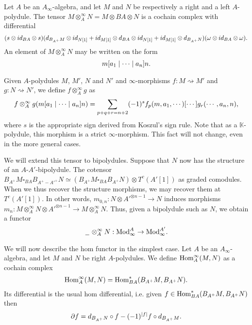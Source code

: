 \documentclass[../thesis.tex]{subfiles}
\begin{document}
            \begin{definition}
                Let $A$ be an $A_\infty$-algebra, and let $M$ and $N$ be respectively a right and a left $A$-polydule. The tensor $M \otimes^\infty_A N = M \otimes BA \otimes N$ is a cochain complex with differential
                \begin{align*}
                    (s\otimes id_{BA} \otimes s)(d_{B_{A^+}M} \otimes id_{N[1]} + id_{M[1]}\otimes d_{BA} \otimes id_{N[1]} + id_{M[1]}\otimes d_{B_{A^+}N})(\omega \otimes id_{BA} \otimes \omega)\tt{.}
                \end{align*}
                An element of $M \otimes^\infty_A N$ may be written on the form
                \begin{align*}
                    m[a_1 \mid \cdots \mid a_n]n\tt{.}
                \end{align*}
            \end{definition}

            Given $A$-polydules $M$, $M'$, $N$ and $N'$ and $\infty$-morphisms $f : M \rightsquigarrow M'$ and $g : N \rightsquigarrow N'$, we define $f \otimes^\infty_A g$ as
            \begin{align*}
                f\otimes^\infty_Ag(m[a_1 \mid \cdots \mid a_n]n) = \sum_{p+q+r = n+2} (-1)^s f_p(m, a_1, \cdots)[\cdots]g_r(\cdots, a_n, n)\tt{,}
            \end{align*}
            where $s$ is the appropriate sign derived from Koszul's sign rule. Note that as a $\mathbb{K}$-polydule, this morphism is a strict $\infty$-morphism. This fact will not change, even in the more general cases.

            We will extend this tensor to bipolydules. Suppose that $N$ now has the structure of an $A$-$A'$-bipolydule. The cotensor $B_{A^+}M \square_{BA} B_{A^+-A'^+}N \simeq (B_{A^+}M \square_{BA} B_{A^+}N) \otimes T^c(A'[1])$ as graded comodules. When we thus recover the structure morphisms, we may recover them at $T^c(A'[1])$. In other words, $m_{0,n} : N \otimes A'^{\otimes n-1} \rightarrow N$ induces morphisms $m_n : M \otimes^\infty_A N \otimes A'^{\otimes n-1} \rightarrow M \otimes^\infty_A N$. Thus, given a bipolydule such as $N$, we obtain a functor
            \begin{align*}
                \argument\otimes^\infty_AN : \tt{Mod}_\infty^A \rightarrow \tt{Mod}_\infty^{A'}\tt{.}
            \end{align*}

            We will now describe the hom functor in the simplest case. Let $A$ be an $A_\infty$-algebra, and let $M$ and $N$ be right $A$-polydules. We define $\tt{Hom}^\infty_A(M, N)$ as a cochain complex
            \begin{align*}
                \tt{Hom}^\infty_A(M,N) = \tt{Hom}_{BA}^*(B_{A^+}M, B_{A^+}N)\tt{.}
            \end{align*}
            Its differential is the usual hom differential, i.e. given $f \in \tt{Hom}_{BA}^*(B_{A^+}M,B_{A^+}N)$ then
            \begin{align*}
                \partial f = d_{B_{A^+}N}\circ f - (-1)^{|f|}f\circ d_{B_{A^+}M}\tt{.}
            \end{align*}
\end{document}
